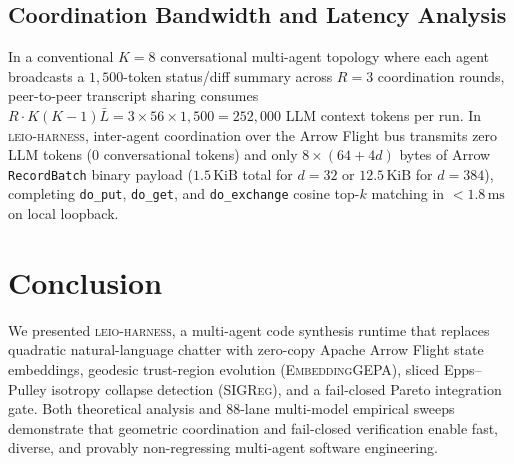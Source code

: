 \documentclass[11pt]{article}
\begin{document}
\subsection{Coordination Bandwidth and Latency Analysis}

In a conventional $K=8$ conversational multi-agent topology where each agent broadcasts a $1{,}500$-token status/diff summary across $R=3$ coordination rounds, peer-to-peer transcript sharing consumes $R \cdot K(K-1)\bar{L} = 3 \times 56 \times 1{,}500 = 252{,}000$ LLM context tokens per run. In \textsc{leio-harness}, inter-agent coordination over the Arrow Flight bus transmits zero LLM tokens ($0$ conversational tokens) and only $8 \times (64 + 4d)$ bytes of Arrow \texttt{RecordBatch} binary payload ($1.5\,\text{KiB}$ total for $d=32$ or $12.5\,\text{KiB}$ for $d=384$), completing \texttt{do\_put}, \texttt{do\_get}, and \texttt{do\_exchange} cosine top-$k$ matching in $< 1.8\,\text{ms}$ on local loopback.

\section{Conclusion}

We presented \textsc{leio-harness}, a multi-agent code synthesis runtime that replaces quadratic natural-language chatter with zero-copy Apache Arrow Flight state embeddings, geodesic trust-region evolution (\textsc{EmbeddingGEPA}), sliced Epps--Pulley isotropy collapse detection (\textsc{SIGReg}), and a fail-closed Pareto integration gate. Both theoretical analysis and 88-lane multi-model empirical sweeps demonstrate that geometric coordination and fail-closed verification enable fast, diverse, and provably non-regressing multi-agent software engineering.
\end{document}
